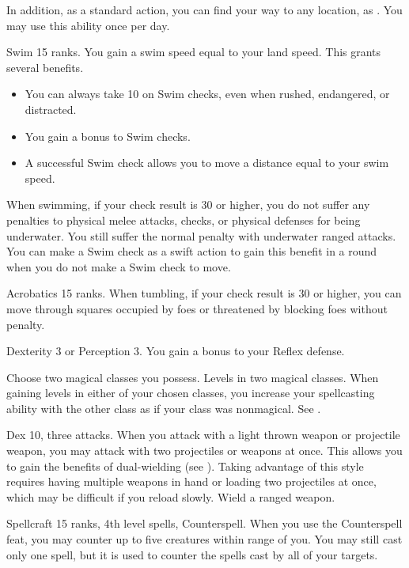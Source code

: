 In addition, as a standard action, you can find your way to any location, as .
You may use this ability once per day.

\featpre Swim 15 ranks.
\featben You gain a swim speed equal to your land speed.
This grants several benefits.
\begin{itemize}
    \item You can always take 10 on Swim checks, even when rushed, endangered, or distracted.
    \item You gain a  bonus to Swim checks.
    \item A successful Swim check allows you to move a distance equal to your swim speed.
\end{itemize}

When swimming, if your check result is 30 or higher, you do not suffer any penalties to physical melee attacks, checks, or physical defenses for being underwater.
You still suffer the normal penalty with underwater ranged attacks.
You can make a Swim check as a swift action to gain this benefit in a round when you do not make a Swim check to move.

\featpre Acrobatics 15 ranks.
\featben When tumbling, if your check result is 30 or higher, you can move through squares occupied by foes or threatened by blocking foes without penalty.

\featpre Dexterity 3 or Perception 3.
\featben You gain a  bonus to your Reflex defense.

Choose two magical classes you possess.
\featpres
Levels in two magical classes.
\featben When gaining levels in either of your chosen classes, you increase your spellcasting ability with the other class as if your class was nonmagical.
See .

\featpres Dex 10, three attacks.
\featben When you attack with a light thrown weapon or projectile weapon, you may attack with two projectiles or weapons at once.
This allows you to gain the benefits of dual-wielding (see ).
Taking advantage of this style requires having multiple weapons in hand or loading two projectiles at once, which may be difficult if you reload slowly.
\stylereq Wield a ranged weapon.

\featpres Spellcraft 15 ranks, 4th level spells, Counterspell.
\featben When you use the Counterspell feat, you may counter up to five creatures within \rngmed range of you.
You may still cast only one spell, but it is used to counter the spells cast by all of your targets.

